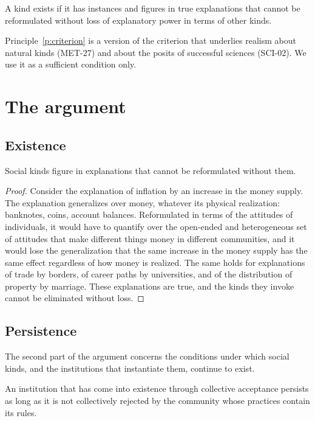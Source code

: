 \documentclass{situationist-preprint}
\begin{document}
\begin{principle}\label{p:criterion}
A kind exists if it has instances and figures in true explanations that cannot be reformulated without loss of explanatory power in terms of other kinds.
\end{principle}

Principle~\ref{p:criterion} is a version of the criterion that underlies realism about natural kinds (MET-27) and about the posits of successful sciences (SCI-02). We use it as a sufficient condition only.

\section{The argument}

\subsection{Existence}

\begin{lemma}\label{l:explain}
Social kinds figure in explanations that cannot be reformulated without them.
\end{lemma}

\begin{proof}
Consider the explanation of inflation by an increase in the money supply. The explanation generalizes over money, whatever its physical realization: banknotes, coins, account balances. Reformulated in terms of the attitudes of individuals, it would have to quantify over the open-ended and heterogeneous set of attitudes that make different things money in different communities, and it would lose the generalization that the same increase in the money supply has the same effect regardless of how money is realized. The same holds for explanations of trade by borders, of career paths by universities, and of the distribution of property by marriage. These explanations are true, and the kinds they invoke cannot be eliminated without loss.
\end{proof}

\subsection{Persistence}

The second part of the argument concerns the conditions under which social kinds, and the institutions that instantiate them, continue to exist.

\begin{lemma}\label{l:persist}
An institution that has come into existence through collective acceptance persists as long as it is not collectively rejected by the community whose practices contain its rules.
\end{lemma}
\end{document}
